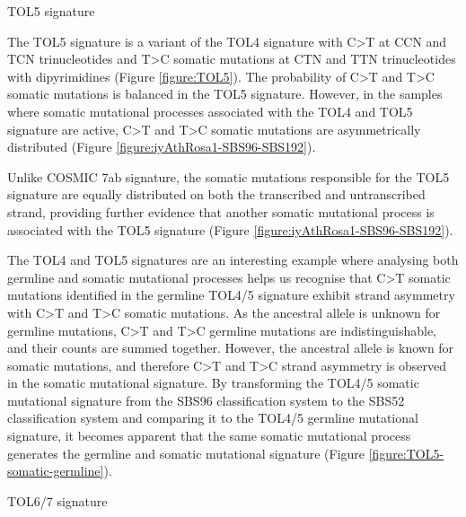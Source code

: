 \begin{description}
    \item[TOL5 signature]
\end{description}

The TOL5 signature is a variant of the TOL4 signature with C>T at CCN and TCN trinucleotides and T>C somatic mutations at CTN and TTN trinucleotides with dipyrimidines (Figure \ref{figure:TOL5}). The probability of C>T and T>C somatic mutations is balanced in the TOL5 signature. However, in the samples where somatic mutational processes associated with the TOL4 and TOL5 signature are active, C>T and T>C somatic mutations are asymmetrically distributed (Figure \ref{figure:iyAthRosa1-SBS96-SBS192}).


Unlike COSMIC 7ab signature, the somatic mutations responsible for the TOL5 signature are equally distributed on both the transcribed and untranscribed strand, providing further evidence that another somatic mutational process is associated with the TOL5 signature (Figure \ref{figure:iyAthRosa1-SBS96-SBS192}).

The TOL4 and TOL5 signatures are an interesting example where analysing both germline and somatic mutational processes helps us recognise that C>T somatic mutations identified in the germline TOL4/5 signature exhibit strand asymmetry with C>T and T>C somatic mutations. As the ancestral allele is unknown for germline mutations, C>T and T>C germline mutations are indistinguishable, and their counts are summed together. However, the ancestral allele is known for somatic mutations, and therefore C>T and T>C strand asymmetry is observed in the somatic mutational signature. By transforming the TOL4/5 somatic mutational signature from the SBS96 classification system to the SBS52 classification system and comparing it to the TOL4/5 germline mutational signature, it becomes apparent that the same somatic mutational process generates the germline and somatic mutational signature (Figure \ref{figure:TOL5-somatic-germline}). 

\begin{description}
    \item[TOL6/7 signature]
\end{description}

